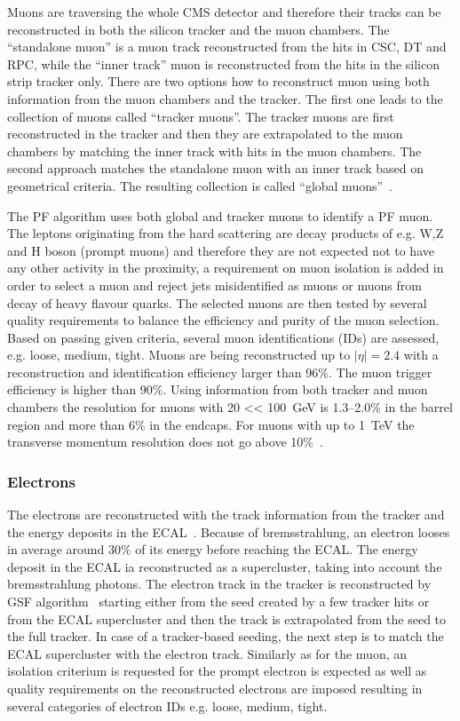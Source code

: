 Muons are traversing the whole CMS detector and therefore their tracks can be reconstructed in both the silicon tracker and the muon chambers. The ``standalone muon'' is a muon track reconstructed from the hits in CSC, DT and RPC, while the ``inner track'' muon is reconstructed from the hits in the silicon strip tracker only. There are two options how to reconstruct muon using both information from the muon chambers and the tracker. The first one leads to the collection of muons called ``tracker muons''.  The tracker muons are first reconstructed in the tracker and then they are extrapolated to the muon chambers by matching the inner track with hits in the muon chambers. The second approach matches the standalone muon with an inner track based on geometrical criteria. The resulting collection is called ``global muons''~\cite{Chatrchyan:2012xi}. 

The PF algorithm uses both global and tracker muons to identify a PF muon. The leptons originating from the hard scattering are decay products of e.g. W,Z and H boson (prompt muons) and therefore they are not expected not to have any other activity in the proximity, a requirement on muon isolation is added in order to select a muon and reject jets misidentified as muons or muons from decay of heavy flavour quarks. The selected muons are then tested by several quality requirements to balance the efficiency and purity of the muon selection. Based on passing given criteria, several muon identifications (IDs) are assessed, e.g. loose, medium, tight. Muons are being reconstructed up to $|\eta|=2.4$ with a reconstruction and identification efficiency larger than 96\%. The muon trigger efficiency is higher than 90\%. Using information from both tracker and muon chambers the \pt resolution for muons with 20 <\pt < 100~GeV is 1.3--2.0\% in the barrel region and more than 6\% in the endcaps. For muons with \pt up to 1~TeV the transverse momentum resolution does not go above 10\%~\cite{Chatrchyan:2012xi}.

\subsubsection{Electrons}

The electrons are reconstructed with the track information from the tracker and the energy deposits in the ECAL~\cite{Khachatryan:2015hwa}. Because of bremsstrahlung, an electron looses in average around 30\% of its energy before reaching the ECAL. The energy deposit in the ECAL ia reconstructed as a supercluster, taking into account the bremsstrahlung photons. The electron track in the tracker is reconstructed by GSF algorithm~\cite{Adam:2003kg} starting either from the seed created by a few tracker hits or from the ECAL supercluster and then the track is extrapolated from the seed to the full tracker. In case of a tracker-based seeding, the next step is to match the ECAL supercluster with the electron track. Similarly as for the muon, an isolation criterium is requested for the prompt electron is expected as well as quality requirements on the reconstructed electrons are imposed resulting in several categories of electron IDs e.g. loose, medium, tight.

